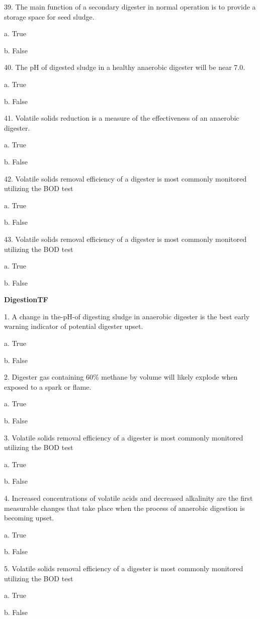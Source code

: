 \documentclass{article}
\begin{document}
39. The main function of a secondary digester in normal operation is to provide a storage space for seed sludge. 

a. True 

b. False 


40. The pH of digested sludge in a healthy anaerobic digester will be near 7.0. 

a. True 

b. False 


41. Volatile solids reduction is a measure of the effectiveness of an anaerobic digester. 

a. True 

b. False 


42. Volatile solids removal efficiency of a digester is most commonly monitored utilizing the BOD test 

a. True 

b. False 


43. Volatile solids removal efficiency of a digester is most commonly monitored utilizing the BOD test 

a. True 

b. False 


\textbf{DigestionTF}

1. A change in the-pH-of digesting sludge in anaerobic digester is the best early warning indicator of potential digester upset. 

a. True 

b. False 


2. Digester gas containing 60\% methane by volume will likely explode when exposed to a spark or flame. 

a. True 

b. False 


3. Volatile solids removal efficiency of a digester is most commonly monitored utilizing the BOD test 

a. True 

b. False 


4. Increased concentrations of volatile acids and decreased alkalinity are the first measurable changes that take place when the process of anaerobic digestion is becoming upset. 

a. True 

b. False 


5. Volatile solids removal efficiency of a digester is most commonly monitored utilizing the BOD test 

a. True 

b. False 
\end{document}
